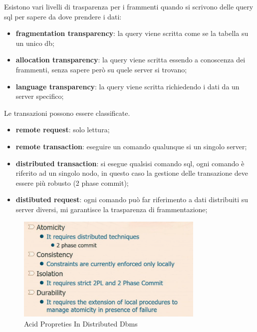 \documentclass[12pt]{article}
\begin{document}
Esistono vari livelli di trasparenza per i frammenti quando si scrivono delle query sql per sapere da dove prendere i dati:
\begin{itemize}
    \item \textbf{fragmentation transparency}: la query viene scritta come se la tabella su un unico db;
    \item \textbf{allocation transparency}: la query viene scritta essendo a conoscenza dei frammenti, senza sapere per\`o su quele server si trovano;
    \item \textbf{language transparency}: la query viene scritta richiedendo i dati da un server specifico;
\end{itemize}
Le transazioni possono essere classificate.
\begin{itemize}
    \item \textbf{remote request}: solo lettura;
    \item \textbf{remote transaction}: eseguire un comando qualunque si un singolo server;
    \item \textbf{distributed transaction}: si esegue qualsisi comando sql, ogni comando \`e riferito ad un singolo nodo, in questo caso la gestione delle transazione deve essere pi\`u robusto (2 phase commit);
    \item \textbf{distibuted request}: ogni comando pu\`o far riferimento a dati distribuiti su server diversi, mi garantisce la trasparenza di frammentazione;
\end{itemize}
\begin{figure}[H]
    \centering
    \includegraphics[width=0.8\textwidth]{acid-propreties-in-distributed-dbms.png}
    \caption{Acid Propreties In Distributed Dbms}
    \label{fig:acid-propreties-in-distributed-dbms}
\end{figure}
\end{document}
